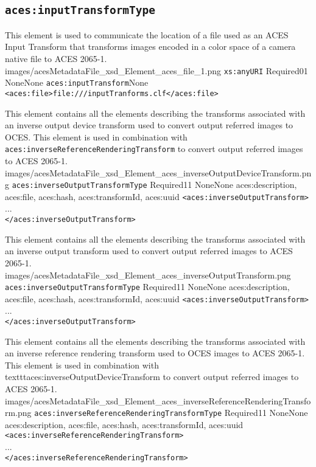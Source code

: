\subsection{\texttt{aces:inputTransformType}}

		{This element is used to communicate the location of a file used as an ACES Input Transform that transforms images encoded in a color space of a camera native file to ACES 2065-1.}
		{images/acesMetadataFile_xsd_Element_aces_file_1.png}
		{\texttt{xs:anyURI}}
		{Required}{0}{1}
		{None}{None}
		{\texttt{aces:inputTransform}}{None}
		{\lstinline{<aces:file>file:///inputTranforms.clf</aces:file>}}
		
        {This element contains all the elements describing the transforms associated with an inverse output device transform used to convert output referred images to OCES.  This element is used in combination with \texttt{aces:inverseReferenceRenderingTransform} to convert output referred images to ACES 2065-1.}
        {images/acesMetadataFile_xsd_Element_aces_inverseOutputDeviceTransform.png}
        {\texttt{aces:inverseOutputTransformType}}
        {Required}{1}{1}
        {None}{None}
        {aces:description, aces:file, aces:hash, aces:transformId, aces:uuid}
        {\lstinline{<aces:inverseOutputTransform>} \\
        ... \\
        \lstinline{</aces:inverseOutputTransform>}}
        
        {This element contains all the elements describing the transforms associated with an inverse output transform used to convert output referred images to ACES 2065-1.}
        {images/acesMetadataFile_xsd_Element_aces_inverseOutputTransform.png}
        {\texttt{aces:inverseOutputTransformType}}
        {Required}{1}{1}
        {None}{None}
        {aces:description, aces:file, aces:hash, aces:transformId, aces:uuid}
        {\lstinline{<aces:inverseOutputTransform>} \\
        ... \\
        \lstinline{</aces:inverseOutputTransform>}}
        
        {This element contains all the elements describing the transforms associated with an inverse reference rendering transform used to OCES images to ACES 2065-1.  This element is used in combination with texttt{aces:inverseOutputDeviceTransform} to convert output referred images to ACES 2065-1.}
        {images/acesMetadataFile_xsd_Element_aces_inverseReferenceRenderingTransform.png}
        {\texttt{aces:inverseReferenceRenderingTransformType}}
        {Required}{1}{1}
        {None}{None}
        {aces:description, aces:file, aces:hash, aces:transformId, aces:uuid}
        {\lstinline{<aces:inverseReferenceRenderingTransform>} \\
        ... \\
        \lstinline{</aces:inverseReferenceRenderingTransform>}}

